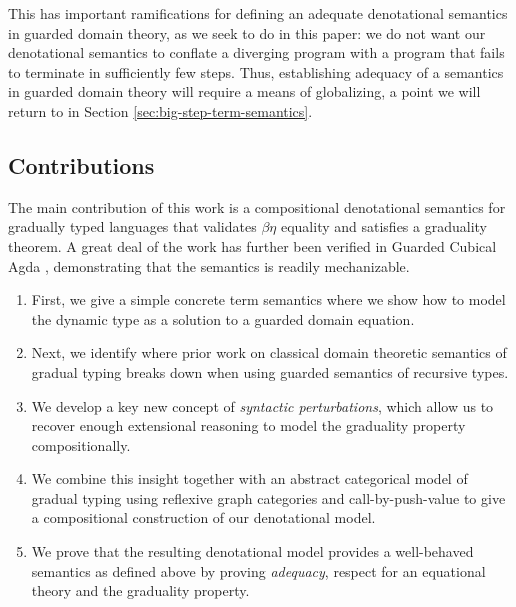 This has important ramifications for defining an adequate denotational semantics
in guarded domain theory, as we seek to do in this paper: we do not want our
denotational semantics to conflate a diverging program with a program that fails
to terminate in sufficiently few steps. Thus, establishing adequacy of a
semantics in guarded domain theory will require a means of globalizing,
a point we will return to in Section \ref{sec:big-step-term-semantics}.





\subsection{Contributions}

The main contribution of this work is a compositional denotational
semantics for gradually typed languages that validates $\beta\eta$
equality and satisfies a graduality theorem. A great deal of the work
has further been verified in Guarded Cubical Agda \cite{veltri-vezzosi2020}, 
demonstrating that the semantics is readily mechanizable.

\begin{enumerate}
\item First, we give a simple concrete term semantics where we show
  how to model the dynamic type as a solution to a guarded domain equation.
\item Next, we identify where prior work on classical domain theoretic
  semantics of gradual typing breaks down when using guarded semantics
  of recursive types.
\item We develop a key new concept of \emph{syntactic perturbations},
  which allow us to recover enough extensional reasoning to model the
  graduality property compositionally.
\item We combine this insight together with an abstract categorical
  model of gradual typing using reflexive graph categories and
  call-by-push-value to give a compositional construction of our
  denotational model.
\item We prove that the resulting denotational model provides a
  well-behaved semantics as defined above by proving \emph{adequacy},
  respect for an equational theory and the graduality property.
\end{enumerate}


